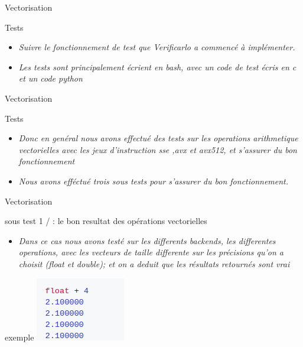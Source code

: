 \documentclass{beamer}
\begin{document}
\begin{frame}{Vectorisation}
\begin{block}{Tests}
    \begin{itemize}
        \item\textit{ Suivre le fonctionnement de test que
Verificarlo a commencé à implémenter. } 
         \item \textit{Les tests sont principalement écrient en bash, avec un code de test écris en c et un code python}  
          
         \end{itemize}  
\end{block}
\end{frame}


\begin{frame}{Vectorisation}
\begin{block}{Tests}
      \begin{itemize}
        \item\textit{Donc en genéral nous avons effectué des tests sur les operations arithmetique vectorielles avec les jeux d'instruction sse ,avx et avx512, et s'assurer du bon fonctionnement } 
         
        \item \textit{Nous avons efféctué trois sous tests pour s'assurer du bon fonctionnement.}   
         
         \end{itemize}
\end{block}
\end{frame}


\begin{frame}{Vectorisation} 
\begin{block}{sous test 1 / : le bon resultat des opérations vectorielles}
 \begin{itemize}
        \item\textit{Dans ce cas nous avons testé sur les differents backends, les differentes operations, avec les vecteurs de taille differente sur les précisions qu'on a choisit (float et double);
        et on a deduit que les résultats retournés sont vrai
        } 
        \end{itemize}   
\end{block}
\begin{block}{exemple}
 \centering\includegraphics[scale=1.0]{../ressources/bon_resultat.png}
\end{block}
\end{frame}
\end{document}
